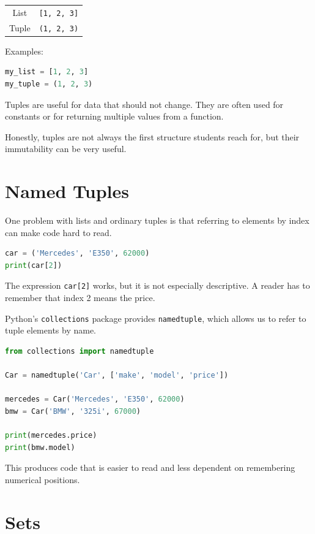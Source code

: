 \documentclass[11pt]{article}
\begin{document}
\begin{center}
\begin{tabular}{c c}
List & \texttt{[1, 2, 3]} \\
Tuple & \texttt{(1, 2, 3)}
\end{tabular}
\end{center}

Examples:

\begin{lstlisting}[language=Python]
my_list = [1, 2, 3]
my_tuple = (1, 2, 3)
\end{lstlisting}

Tuples are useful for data that should not change. They are often used for constants or for returning multiple values from a function.

Honestly, tuples are not always the first structure students reach for, but their immutability can be very useful.

\section{Named Tuples}

One problem with lists and ordinary tuples is that referring to elements by index can make code hard to read.

\begin{lstlisting}[language=Python]
car = ('Mercedes', 'E350', 62000)
print(car[2])
\end{lstlisting}

The expression \texttt{car[2]} works, but it is not especially descriptive. A reader has to remember that index 2 means the price.

Python's \texttt{collections} package provides \texttt{namedtuple}, which allows us to refer to tuple elements by name.

\begin{lstlisting}[language=Python]
from collections import namedtuple

Car = namedtuple('Car', ['make', 'model', 'price'])

mercedes = Car('Mercedes', 'E350', 62000)
bmw = Car('BMW', '325i', 67000)

print(mercedes.price)
print(bmw.model)
\end{lstlisting}

This produces code that is easier to read and less dependent on remembering numerical positions.

\section{Sets}
\end{document}
